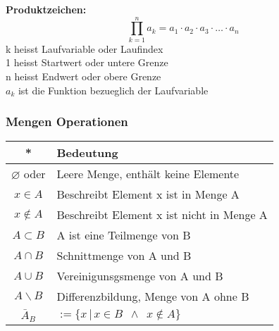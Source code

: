 \begin{multicols}{2}
    \textbf{Produktzeichen:}
    \[ \prod_{k=1}^{n} a_k = a_1 \cdot a_2 \cdot a_3 \cdot \ldots \cdot a_n\]
    k heisst Laufvariable oder Laufindex \\
    1 heisst Startwert oder untere Grenze \\
    n heisst Endwert oder obere Grenze \\
    $a_{k}$ ist die Funktion bezueglich der Laufvariable \\

    \subsubsection{Mengen Operationen}

    \begin{tabularx}{0.5\textwidth} {
            | >{\raggedright\arraybackslash}c
            | >{\raggedright\arraybackslash}X |}
        \hline
        \textbf{*}            & \textbf{Bedeutung}                                           \\ \hline
        $\varnothing$ oder {} & Leere Menge, enthält keine Elemente                          \\ \hline
        $x\in A$              & Beschreibt Element x ist in Menge A                          \\ \hline
        $x\notin A$           & Beschreibt Element x ist nicht in Menge A                    \\ \hline
        $A\subset B$          & A ist eine Teilmenge von B                                   \\ \hline
        $A\cap B$             & Schnittmenge von A und B                                     \\ \hline
        $A\cup B$             & Vereinigunsgsmenge von A und B                               \\ \hline
        $A\backslash B$       & Differenzbildung, Menge von A ohne B                         \\\hline
        $\bar{A}_B$           & $:= \{x \,|\, x \in B \enspace \wedge \enspace x \notin A\}$ \\\hline
    \end{tabularx}
    \\~\\
    \\~\\
    \\~\\

    \def\firstcircle{(0,0) circle (1cm)}
    \def\secondcircle{(0:1.2cm) circle (1cm)}


\end{multicols}
